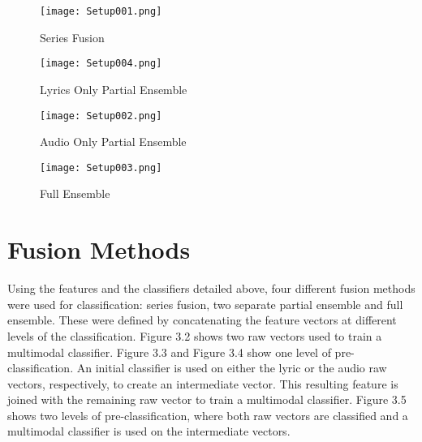 \begin{figure}
\begin{minipage}[b]{0.6\linewidth}
  \centering
  \hspace*{-.7in}
  \texttt{[image: Setup001.png]}
  \caption{Series Fusion}
  \label{fig:blah1}
\end{minipage}
\hfill
\begin{minipage}[b]{0.6\linewidth}
  \centering
    \hspace*{-.3in}
  \texttt{[image: Setup004.png]}
  \caption{Lyrics Only Partial Ensemble}
  \label{fig:blah2}
\end{minipage}

\vspace{1em} %


\begin{minipage}[b]{0.6\linewidth}
  \centering
  \hspace*{-0.7in}
  \texttt{[image: Setup002.png]}
  \caption{Audio Only Partial Ensemble}
  \label{fig:blah1}
\end{minipage}
\hfill
\begin{minipage}[b]{0.6\linewidth}
  \centering
      \hspace*{-.3in}
  \texttt{[image: Setup003.png]}
  \caption{Full Ensemble}
  \label{fig:blah2}
\end{minipage}
\end{figure}


\section*{Fusion Methods}

Using the features and the classifiers detailed above, four different fusion methods were used for 
classification: series fusion, two separate partial ensemble and full ensemble. These were defined by
concatenating the feature vectors at different levels of the classification. Figure 3.2 shows two raw vectors used to train a multimodal
classifier. Figure 3.3 and Figure 3.4 show one level of pre-classification.  An initial classifier is used on either the lyric or 
the audio raw vectors, respectively, to create an intermediate vector. This resulting feature is joined with the remaining raw vector to train
a multimodal classifier. Figure 3.5 shows two levels of pre-classification, where both raw vectors are classified 
and a multimodal classifier is used on the intermediate vectors.

